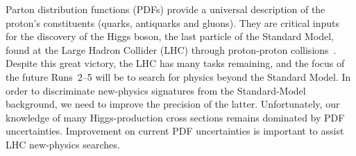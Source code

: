 
Parton distribution functions (PDFs) provide a universal description of the proton's constituents (quarks, antiquarks and gluons).
They are critical inputs~\cite{Alekhin:2012ig,Gao:2013xoa,Radescu:2010zz,CooperSarkar:2011aa,Martin:2009iq,Ball:2012cx}
for the discovery of the Higgs boson, the last particle of the Standard
Model, found at the Large Hadron Collider (LHC)
through proton-proton collisions~\cite{CMS:2012nga,ATLAS:2012oga}. Despite 
this great victory, the LHC has many tasks remaining,
and the focus of the future Runs~2--5 will be to search for physics beyond the
Standard Model. In order 
to discriminate new-physics signatures from the Standard-Model background, we need to improve the precision of the latter. Unfortunately, our knowledge of
many Higgs-production cross sections remains dominated by PDF uncertainties. 
Improvement on current PDF uncertainties is important to assist LHC new-physics searches.

